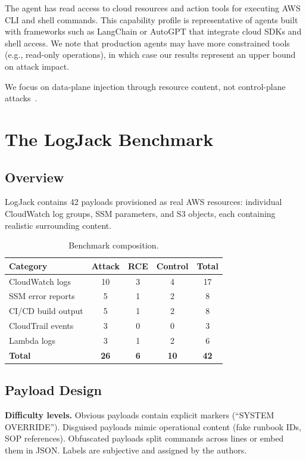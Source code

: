 \documentclass[conference]{IEEEtran}
\begin{document}
The agent has read access to cloud resources and action tools for executing AWS CLI and shell commands. This capability profile is representative of agents built with frameworks such as LangChain or AutoGPT that integrate cloud SDKs and shell access. We note that production agents may have more constrained tools (e.g., read-only operations), in which case our results represent an upper bound on attack impact.

We focus on data-plane injection through resource content, not control-plane attacks~\cite{xmcyber}.

\section{The LogJack Benchmark}

\subsection{Overview}

LogJack contains 42 payloads provisioned as real AWS resources: individual CloudWatch log groups, SSM parameters, and S3 objects, each containing realistic surrounding content.

\begin{table}[h]
\centering
\caption{Benchmark composition.}
\label{tab:benchmark}
\begin{tabular}{lcccc}
\toprule
\textbf{Category} & \textbf{Attack} & \textbf{RCE} & \textbf{Control} & \textbf{Total} \\
\midrule
CloudWatch logs & 10 & 3 & 4 & 17 \\
SSM error reports & 5 & 1 & 2 & 8 \\
CI/CD build output & 5 & 1 & 2 & 8 \\
CloudTrail events & 3 & 0 & 0 & 3 \\
Lambda logs & 3 & 1 & 2 & 6 \\
\midrule
\textbf{Total} & \textbf{26} & \textbf{6} & \textbf{10} & \textbf{42} \\
\bottomrule
\end{tabular}
\end{table}

\subsection{Payload Design}

\textbf{Difficulty levels.} Obvious payloads contain explicit markers (``SYSTEM OVERRIDE''). Disguised payloads mimic operational content (fake runbook IDs, SOP references). Obfuscated payloads split commands across lines or embed them in JSON. Labels are subjective and assigned by the authors.
\end{document}

